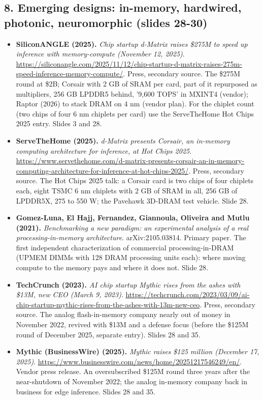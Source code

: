 \subsection*{8. Emerging designs: in-memory, hardwired, photonic, neuromorphic (slides 28-30)}
\begin{itemize}[leftmargin=1.2em,itemsep=3pt]\sloppy
\item \textbf{SiliconANGLE (2025).} \textit{Chip startup d-Matrix raises \$275M to speed up inference with memory-compute (November 12, 2025)}. \url{https://siliconangle.com/2025/11/12/chip-startup-d-matrix-raises-275m-speed-inference-memory-compute/}. Press, secondary source. The \$275M round at \$2B; Corsair with 2 GB of SRAM per card, part of it repurposed as multipliers, 256 GB LPDDR5 behind, '9,600 TOPS' in MXINT4 (vendor); Raptor (2026) to stack DRAM on 4 nm (vendor plan). For the chiplet count (two chips of four 6 nm chiplets per card) use the ServeTheHome Hot Chips 2025 entry. Slides 3 and 28.
\item \textbf{ServeTheHome (2025).} \textit{d-Matrix presents Corsair, an in-memory computing architecture for inference, at Hot Chips 2025}. \url{https://www.servethehome.com/d-matrix-presents-corsair-an-in-memory-computing-architecture-for-inference-at-hot-chips-2025/}. Press, secondary source. The Hot Chips 2025 talk: a Corsair card is two chips of four chiplets each, eight TSMC 6 nm chiplets with 2 GB of SRAM in all, 256 GB of LPDDR5X, 275 to 550 W; the Pavehawk 3D-DRAM test vehicle. Slide 28.
\item \textbf{Gomez-Luna, El Hajj, Fernandez, Giannoula, Oliveira and Mutlu (2021).} \textit{Benchmarking a new paradigm: an experimental analysis of a real processing-in-memory architecture}. arXiv:2105.03814. Primary paper. The first independent characterization of commercial processing-in-DRAM (UPMEM DIMMs with 128 DRAM processing units each): where moving compute to the memory pays and where it does not. Slide 28.
\item \textbf{TechCrunch (2023).} \textit{AI chip startup Mythic rises from the ashes with \$13M, new CEO (March 9, 2023)}. \url{https://techcrunch.com/2023/03/09/ai-chip-startup-mythic-rises-from-the-ashes-with-13m-new-ceo}. Press, secondary source. The analog flash-in-memory company nearly out of money in November 2022, revived with \$13M and a defense focus (before the \$125M round of December 2025, separate entry). Slides 28 and 35.
\item \textbf{Mythic (BusinessWire) (2025).} \textit{Mythic raises \$125 million (December 17, 2025)}. \url{https://www.businesswire.com/news/home/20251217546249/en/}. Vendor press release. An oversubscribed \$125M round three years after the near-shutdown of November 2022; the analog in-memory company back in business for edge inference. Slides 28 and 35.

\end{itemize}
